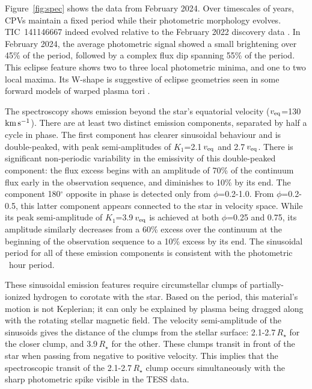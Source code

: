 \documentclass{nature3}
\newcommand{\kms}{\ensuremath{\rm km\,s^{-1}}}
\begin{document}
Figure~\ref{fig:spec} shows the data from February 2024.  Over
timescales of years, CPVs maintain a fixed period while their
photometric morphology evolves.  TIC~141146667 indeed evolved relative
to the February 2022 discovery data \cite{Bouma2024}.  In February
2024, the average photometric signal showed a small brightening
over 45\% of the period, followed by a complex flux dip spanning 55\%
of the period.  This eclipse feature shows two to three local
photometric minima, and one to two local maxima.  Its W-shape is
suggestive of eclipse geometries seen in some forward models of warped
plasma tori \cite{Townsend2008}.

The spectroscopy shows emission beyond the star's equatorial velocity
($v_{\rm eq}$=130\,\kms).  There are at least two distinct emission
components, separated by half a cycle in phase.  The first component
has clearer sinusoidal behaviour and is double-peaked, with peak
semi-amplitudes of $K_1$=2.1\,$v_{\rm eq}$ and 2.7\,$v_{\rm eq}$.
There is significant non-periodic variability in the emissivity of
this double-peaked component: the flux excess begins with an amplitude
of 70\% of the continuum flux early in the observation sequence, and
diminishes to 10\% by its end.  The component 180$^\circ$ opposite in
phase is detected only from $\phi$=0.2-1.0.  From $\phi$=0.2-0.5, this
latter component appears connected to the star in velocity space.
While its peak semi-amplitude of $K_1$=3.9\,$v_{\rm eq}$ is achieved
at both $\phi$=0.25 and 0.75, its amplitude similarly decreases from a
60\% excess over the continuum at the beginning of the observation
sequence to a 10\% excess by its end.  The sinusoidal period for all
of these emission components is consistent with the photometric
\periodhr\ hour period.  

These sinusoidal emission features require circumstellar clumps of
partially-ionized hydrogen to corotate with the star.  
Based on the period, this material's motion is not Keplerian; it can
only be explained by plasma being dragged along with the rotating
stellar magnetic field. 
The velocity semi-amplitude of the sinusoids gives the distance
of the clumps from the stellar surface: 2.1-2.7\,$R_\star$ for the
closer clump, and 3.9\,$R_\star$ for the other.   These clumps transit
in front of the star when passing from negative to positive velocity.
This implies that the spectroscopic transit of the 2.1-2.7\,$R_\star$
clump occurs simultaneously with the sharp photometric spike visible
in the TESS data.
\end{document}
